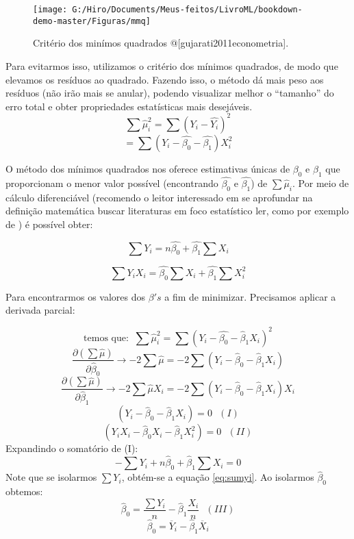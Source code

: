 \documentclass[
  openany]{book}
\begin{document}
\begin{figure}

{\centering \texttt{[image: G:/Hiro/Documents/Meus-feitos/LivroML/bookdown-demo-master/Figuras/mmq]} 

}

\caption{Critério dos minímos quadrados @{[}gujarati2011econometria{]}.}\label{fig:mmq}
\end{figure}



Para evitarmos isso, utilizamos o critério dos mínimos quadrados, de modo que elevamos os resíduos ao quadrado. Fazendo isso, o método dá mais peso aos resíduos (não irão mais se anular), podendo visualizar melhor o ``tamanho'' do erro total e obter propriedades estatísticas mais desejáveis.
\[\sum \hat{\mu}^2_i=\sum(Y_i-\hat{Y_i})^2 \]
\begin{equation}
    = \sum (Y_i-\hat{\beta_0}-\hat{\beta_1})X_i^2 
    \label{eq:mmqeq}
\end{equation}

O método dos mínimos quadrados nos oferece estimativas únicas de \(\beta_0\) e \(\beta_1\) que proporcionam o menor valor possível (encontrando \(\hat{\beta_0}\) e \(\hat{\beta_1}\)) de \(\sum \hat{\mu}_i\). Por meio de cálculo diferenciável (recomendo o leitor interessado em se aprofundar na definição matemática buscar literaturas em foco estatístico ler, como por exemplo de \citet{gujarati2011econometria}) é possível obter:

\begin{equation}
    \sum Y_i=n\hat{\beta_0} + \hat{\beta_1} \sum X_i
    \label{eq:sumyi}
\end{equation}

\begin{equation}
    \sum Y_i X_i=\hat{\beta_0} \sum X_i + \hat{\beta_1} \sum X_i^2
    \label{eq:sumyixi}
\end{equation}

Para encontrarmos os valores dos \(\beta's\) a fim de minimizar. Precisamos aplicar a derivada parcial:

\[\mbox{temos que:  }\ \sum\hat{\mu}_i^2=\sum(Y_i-\hat{\beta_0}-\hat{\beta}_1X_i)^2\]
\[\frac{\partial(\sum\hat{\mu})}{\partial \hat{\beta}_0}\rightarrow-2\sum\hat{\mu}=-2\sum(Y_i-\hat{\beta}_0-\hat{\beta}_1X_i)\]
\[\frac{\partial(\sum\hat{\mu})}{\partial \hat{\beta}_1}\rightarrow-2\sum\hat{\mu}X_i=-2\sum(Y_i-\hat{\beta}_0-\hat{\beta}_1X_i)X_i\]
\[(Y_i-\hat{\beta}_0-\hat{\beta}_1X_i)=0 \ \ \ (I)\]
\[(Y_i X_i-\hat{\beta}_0X_i-\hat{\beta}_1X_i^2)=0 \ \ \ (II)\]
Expandindo o somatório de (I):
\[-\sum Y_i+ n\hat{\beta}_0+\hat{\beta}_1\sum X_i=0\]
Note que se isolarmos \(\sum Y_i\), obtém-se a equação \eqref{eq:sumyi}. Ao isolarmos \(\hat{\beta}_0\) obtemos:
\[\hat{\beta}_0=\frac{\sum Y_i}{n}-\hat{\beta}_1\frac{X_i}{n} \ \ \ (III)\]
\begin{equation}
\hat{\beta}_0=\overline{Y}_i-\hat{\beta}_1\overline{X}_i
\label{eq:betazero}
\end{equation}
\end{document}
